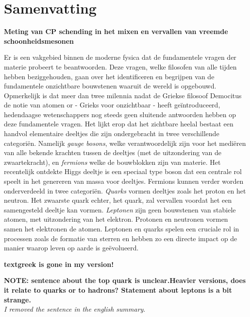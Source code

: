 \chapter*{Samenvatting}

{\Large\bf
  Meting van CP schending in het mixen en vervallen van vreemde schoonheidsmesonen
}
\vspace*{0.05\textwidth}


Er is een vakgebied binnen de moderne fysica dat de fundamentele vragen der materie probeert te beantwoorden. Deze vragen, welke filosofen van alle tijden hebben beziggehouden, gaan over het identificeren en begrijpen van de fundamentele onzichtbare bouwstenen waaruit de wereld is opgebouwd. Opmerkelijk is dat meer dan twee milennia nadat de Griekse filosoof Democitus de notie van atomen or \textgreek{} - Grieks voor onzichtbaar -  heeft ge\"introduceerd, hedendaagse wetenschappers nog steeds geen sluitende antwoorden hebben op deze fundamentele vragen. Het lijkt erop dat het zichtbare heelal bestaat een handvol elementaire deeltjes die zijn ondergebracht in twee verschillende categori\"en. Namelijk {\it gauge bosons}, welke verantwoordelijk zijn voor het medi\"eren van alle bekende krachten tussen de deeltjes (met de uitzondering van de zwaartekracht), en {\it fermions} welke de bouwblokken zijn van materie. Het recentelijk ontdekte Higgs deeltje \cite{higgs-cms,higgs-atlas} is een speciaal type boson dat een centrale rol speelt in het genereren van massa voor deeltjes. Fermions kunnen verder worden onderverdeeld in twee categori\"en. {\it Quarks} vormen deeltjes zoals het proton en het neutron. Het zwaarste quark echter, het \tquark quark, zal vervallen voordat het een samengesteld deeltje kan vormen. {\it Leptonen} zijn geen bouwstenen van stabiele atomen, met uitzondering van het elektron. Protonen en neutronen vormen samen het elektronen de atomen. Leptonen en quarks spelen een cruciale rol in processen zoals de formatie van sterren en hebben zo een directe impact op de manier waarop leven op aarde is ge\"evolueerd.

\textbf{ textgreek is gone in my version!}

\textbf{NOTE: sentence about the top quark is unclear.Heavier versions, does it relate to quarks or to hadrons?
Statement about leptons is a bit strange.}\\
{\color{green}\it  I removed the sentence in the english summary}.\\

